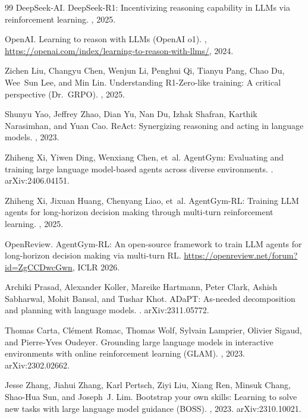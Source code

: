 \documentclass[11pt,a4paper]{article}
\begin{document}
\begin{thebibliography}{99}
DeepSeek-AI.
\newblock DeepSeek-R1: Incentivizing reasoning capability in LLMs via reinforcement learning.
, 2025.

OpenAI.
\newblock Learning to reason with LLMs (OpenAI o1).
, \url{https://openai.com/index/learning-to-reason-with-llms/}, 2024.

Zichen Liu, Changyu Chen, Wenjun Li, Penghui Qi, Tianyu Pang, Chao Du, Wee~Sun Lee, and Min Lin.
\newblock Understanding R1-Zero-like training: A critical perspective (Dr.~GRPO).
, 2025.

Shunyu Yao, Jeffrey Zhao, Dian Yu, Nan Du, Izhak Shafran, Karthik Narasimhan, and Yuan Cao.
\newblock ReAct: Synergizing reasoning and acting in language models.
, 2023.

Zhiheng Xi, Yiwen Ding, Wenxiang Chen, et~al.
\newblock AgentGym: Evaluating and training large language model-based agents across diverse environments.
. arXiv:2406.04151.

Zhiheng Xi, Jixuan Huang, Chenyang Liao, et~al.
\newblock AgentGym-RL: Training LLM agents for long-horizon decision making through multi-turn reinforcement learning.
, 2025.

OpenReview.
\newblock AgentGym-RL: An open-source framework to train LLM agents for long-horizon decision making via multi-turn RL.
\newblock \url{https://openreview.net/forum?id=ZgCCDwcGwn}, ICLR 2026.

Archiki Prasad, Alexander Koller, Mareike Hartmann, Peter Clark, Ashish Sabharwal, Mohit Bansal, and Tushar Khot.
\newblock ADaPT: As-needed decomposition and planning with language models.
. arXiv:2311.05772.

Thomas Carta, Clément Romac, Thomas Wolf, Sylvain Lamprier, Olivier Sigaud, and Pierre-Yves Oudeyer.
\newblock Grounding large language models in interactive environments with online reinforcement learning (GLAM).
, 2023. arXiv:2302.02662.

Jesse Zhang, Jiahui Zhang, Karl Pertsch, Ziyi Liu, Xiang Ren, Minsuk Chang, Shao-Hua Sun, and Joseph~J. Lim.
\newblock Bootstrap your own skills: Learning to solve new tasks with large language model guidance (BOSS).
, 2023. arXiv:2310.10021.


\end{thebibliography}
\end{document}
